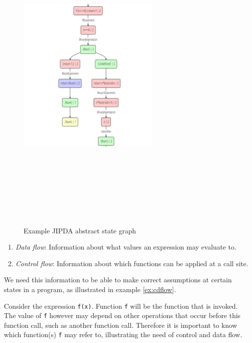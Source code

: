 \begin{figure}[!ht]
    \centering
      \includegraphics[width=262px, height=606px, keepaspectratio]{images/JipdaGraph} 
      \caption{Example JIPDA abstract state graph}
    \label{fig:JipdaGraph}
\end{figure}

\begin{enumerate}
\item \textit{Data flow}: Information about what values an expression may evaluate to.
\item \textit{Control flow}: Information about which functions can be applied at a call site.
\end{enumerate}

\noindent We need this information to be able to make correct assumptions at certain states in a program, as illustrated in example \ref{ex:cdflow}. 

\begin{exmp}
\label{ex:cdflow}
Consider the expression \texttt{f(x)}. Function \texttt{f} will be the function that is invoked. The value of \texttt{f} however may depend on other operations that occur before this function call, such as another function call. Therefore it is important to know which function(s) \texttt{f} may refer to, illustrating the need of control and data flow.
\end{exmp}

